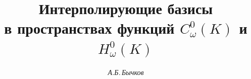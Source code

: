 






\newcommand{\Span}{\operatorname{span}}


\newcommand{\vraisup}{\operatorname{vrai~sup}}


\newcommand{\tts}[1]{}










\setcounter{page}{3}












\author{\it А.Б.\,Бычков}




\title{Интерполирующие базисы\\


в пространствах функций $C^0_\omega(K)$ и $H^0_\omega(K)$}







\date{}







\pagestyle{plain} %













